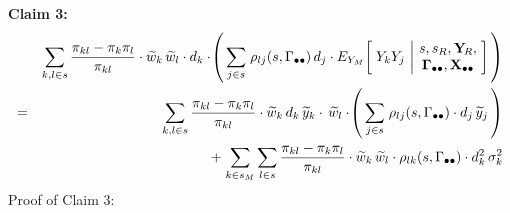 \begin{enumerate}
    \vskip 0.3cm
    \noindent
    \textbf{Claim 3:}\quad
    \begin{eqnarray*}
    &&
        \underset{k,l \in s}{\sum}\,
        \dfrac{\pi_{kl} - \pi_{k}\pi_{l}}{\pi_{kl}}
        \cdot
        \widetilde{w}_{k}\,\widetilde{w}_{l}
        \cdot
        d_{k}
        \cdot\!
        \left(\,
            \underset{j \in s}{\sum}\;
            \rho_{lj}(s,\Gamma_{\bullet\bullet})\,d_{j}
            \cdot
            E_{Y_{M}}\!\left[\;
                Y_{k}Y_{j}
                \,\left\vert\!
                \begin{array}{c} s,s_{R},\mathbf{Y}_{\!R}, \\ \mathbf{\Gamma}_{\bullet\bullet},\mathbf{X}_{\bullet\bullet} \end{array}
                \right.
                \!\!\right]
            \,\right)
    \\
    & {\color{black}=} &
        \underset{k,l \in s}{\sum}\,
        \dfrac{\pi_{kl} - \pi_{k}\pi_{l}}{\pi_{kl}}
        \cdot
        \widetilde{w}_{k}\,d_{k}\,\widetilde{y}_{k}
        \cdot
        \,\widetilde{w}_{l}
        \cdot\!
        \left(\,
            \underset{j \in s}{\sum}\;
            \rho_{lj}(s,\Gamma_{\bullet\bullet})
            \cdot
            d_{j}\,\widetilde{y}_{j}
            \,\right)
    \\
    &&
        \; + \;
        \underset{k \in {\color{black}s_{M}}}{\sum}\,
        \underset{l \in {\color{black}s}}{\sum}\,
        \dfrac{\pi_{kl} - \pi_{k}\pi_{l}}{\pi_{kl}}
        \cdot
        \widetilde{w}_{k}\,\widetilde{w}_{l}
        \cdot
        \rho_{lk}(s,\Gamma_{\bullet\bullet})
        \cdot
        d_{k}^{2}\,
        \sigma_{k}^{2}
    \end{eqnarray*}
    Proof of Claim 3:\;\; 

\end{enumerate}
